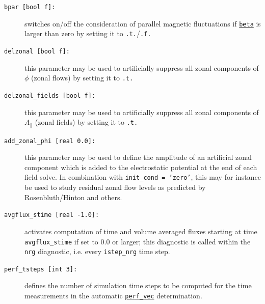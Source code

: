 \documentclass[12pt]{article}
\begin{document}
\begin{description}
\item[\hypertarget{bpar}{\tt bpar [bool f]:}] switches on/off the consideration of parallel magnetic fluctuations if 
  \hyperlink{beta}{\tt beta} is larger than zero by setting it to \texttt{.t.}/\texttt{.f.}
\item[\texttt{delzonal [bool f]:}] this parameter may be used to
artificially suppress all zonal components of $\phi$ (zonal flows)
  by setting it to \texttt{.t.}
\item[\texttt{delzonal\_fields [bool f]:}] this parameter may be used to
artificially suppress all zonal components of $A_{\parallel}$ (zonal
fields) by setting it to \texttt{.t.}
\item[\texttt{add\_zonal\_phi [real 0.0]:}] this parameter may be used to define the amplitude 
of an artificial zonal component which is added to the electrostatic potential at the end of each
field solve. In combination with {\tt init\_cond = 'zero'}, this may for instance be used to study 
residual zonal flow levels as predicted by Rosenbluth/Hinton and others.
\item[\texttt{avgflux\_stime [real -1.0]:}] activates computation of time and volume averaged fluxes starting 
at time \texttt{avgflux\_stime} if set to 0.0 or larger; this diagnostic is called within the \texttt{nrg} 
diagnostic, i.e. every \texttt{istep\_nrg} time step.
\item[\texttt{perf\_tsteps [int 3]:}] defines the number of simulation time steps to be computed for the 
time measurements in the automatic \hyperlink{perf_vec}{\tt perf\_vec} determination.
\end{description}
%
\newpage
\end{document}
